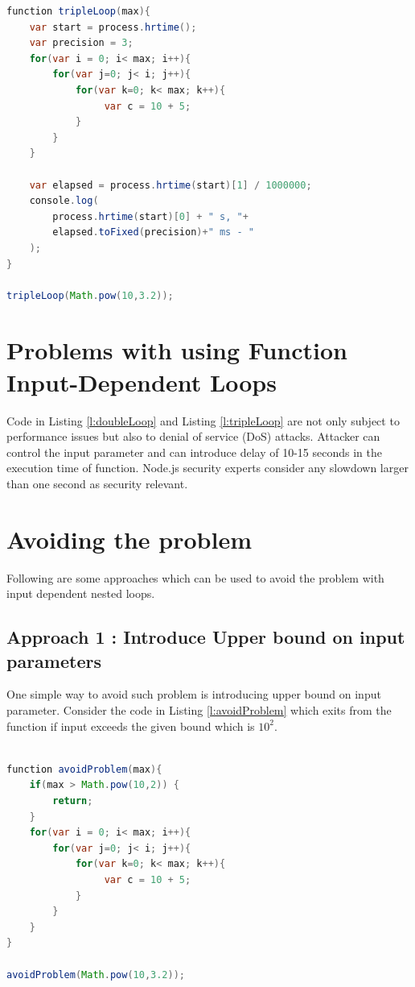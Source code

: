 \documentclass[authoryear,preprint]{sigplanconf}
\begin{document}
\begin{lstlisting}[caption=tripleLoop function with three nested loops,label=l:tripleLoop,language=Java]
function tripleLoop(max){
    var start = process.hrtime();
    var precision = 3;
    for(var i = 0; i< max; i++){
    	for(var j=0; j< i; j++){
    		for(var k=0; k< max; k++){
				 var c = 10 + 5;
 			}
 		}
 	}

    var elapsed = process.hrtime(start)[1] / 1000000;
	console.log(
		process.hrtime(start)[0] + " s, "+
		elapsed.toFixed(precision)+" ms - " 
	);
}

tripleLoop(Math.pow(10,3.2));

\end{lstlisting}


\section{Problems with using Function Input-Dependent Loops}
\label{sec:problems}
Code in Listing \ref{l:doubleLoop} and Listing \ref{l:tripleLoop} are not only subject to performance issues but also to denial of service (DoS) attacks. Attacker can control the input parameter and can introduce delay of 10-15 seconds in the execution time of function. Node.js security experts consider any slowdown larger than one second as security relevant.

\section{Avoiding the problem}
\label{sec:avoiding}

Following are some approaches which can be used to avoid the problem with input dependent nested loops.

\subsection{Approach 1 : Introduce Upper bound on input parameters}
One simple way to avoid such problem is introducing upper bound on input parameter.
Consider the code in Listing \ref{l:avoidProblem} which exits from the function if input exceeds the given bound which is \begin{math} 10^{2} \end{math}.

\begin{lstlisting}[caption=avoidProblem function with 3 nested loops and upper bound on input parameter,label=l:avoidProblem,language=Java]

function avoidProblem(max){
	if(max > Math.pow(10,2)) {
		return;	
	}
    for(var i = 0; i< max; i++){
    	for(var j=0; j< i; j++){
    		for(var k=0; k< max; k++){
				 var c = 10 + 5;
 			}
 		}
 	}
}

avoidProblem(Math.pow(10,3.2));

\end{lstlisting}
\end{document}
